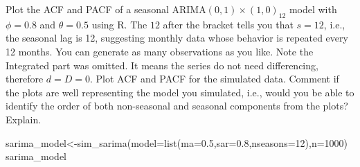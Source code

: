 \documentclass[
]{article}
\newenvironment{Shaded}{\begin{snugshade}}{\end{snugshade}}
\newcommand{\AttributeTok}[1]{\textcolor[rgb]{0.77,0.63,0.00}{#1}}
\newcommand{\DecValTok}[1]{\textcolor[rgb]{0.00,0.00,0.81}{#1}}
\newcommand{\FloatTok}[1]{\textcolor[rgb]{0.00,0.00,0.81}{#1}}
\newcommand{\FunctionTok}[1]{\textcolor[rgb]{0.00,0.00,0.00}{#1}}
\newcommand{\NormalTok}[1]{#1}
\newcommand{\OtherTok}[1]{\textcolor[rgb]{0.56,0.35,0.01}{#1}}
\begin{document}
Plot the ACF and PACF of a seasonal ARIMA\((0, 1)\times(1, 0)_{12}\)
model with \(\phi =0 .8\) and \(\theta = 0.5\) using R. The \(12\) after
the bracket tells you that \(s=12\), i.e., the seasonal lag is 12,
suggesting monthly data whose behavior is repeated every 12 months. You
can generate as many observations as you like. Note the Integrated part
was omitted. It means the series do not need differencing, therefore
\(d=D=0\). Plot ACF and PACF for the simulated data. Comment if the
plots are well representing the model you simulated, i.e., would you be
able to identify the order of both non-seasonal and seasonal components
from the plots? Explain.

\begin{Shaded}
\begin{Highlighting}[]
\NormalTok{sarima\_model}\OtherTok{\textless{}{-}}\FunctionTok{sim\_sarima}\NormalTok{(}\AttributeTok{model=}\FunctionTok{list}\NormalTok{(}\AttributeTok{ma=}\FloatTok{0.5}\NormalTok{,}\AttributeTok{sar=}\FloatTok{0.8}\NormalTok{,}\AttributeTok{nseasons=}\DecValTok{12}\NormalTok{),}\AttributeTok{n=}\DecValTok{1000}\NormalTok{)}
\NormalTok{sarima\_model}
\end{Highlighting}
\end{Shaded}
\end{document}
